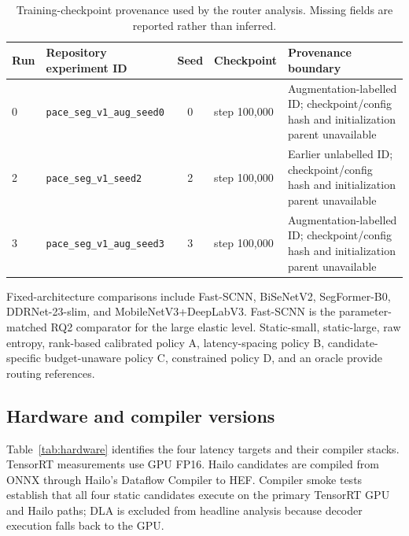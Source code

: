 \documentclass[a4paper,review,12pt]{elsarticle}
\begin{document}
\begin{table}[t]
\centering
\caption{Training-checkpoint provenance used by the router analysis. Missing fields are reported rather than inferred.}
\label{tab:provenance}
\small
\begin{tabularx}{\textwidth}{@{}lXclX@{}}
\toprule
Run & Repository experiment ID & Seed & Checkpoint & Provenance boundary \\
\midrule
0 & \texttt{pace\_seg\_v1\_aug\_seed0} & 0 & step 100,000 & Augmentation-labelled ID; checkpoint/config hash and initialization parent unavailable \\
2 & \texttt{pace\_seg\_v1\_seed2} & 2 & step 100,000 & Earlier unlabelled ID; checkpoint/config hash and initialization parent unavailable \\
3 & \texttt{pace\_seg\_v1\_aug\_seed3} & 3 & step 100,000 & Augmentation-labelled ID; checkpoint/config hash and initialization parent unavailable \\
\bottomrule
\end{tabularx}
\end{table}

Fixed-architecture comparisons include Fast-SCNN, BiSeNetV2, SegFormer-B0, DDRNet-23-slim, and MobileNetV3+DeepLabV3. Fast-SCNN is the parameter-matched RQ2 comparator for the large elastic level. Static-small, static-large, raw entropy, rank-based calibrated policy A, latency-spacing policy B, candidate-specific budget-unaware policy C, constrained policy D, and an oracle provide routing references.

\subsection{Hardware and compiler versions}

Table~\ref{tab:hardware} identifies the four latency targets and their compiler stacks. TensorRT measurements use GPU FP16. Hailo candidates are compiled from ONNX through Hailo's Dataflow Compiler to HEF. Compiler smoke tests establish that all four static candidates execute on the primary TensorRT GPU and Hailo paths; DLA is excluded from headline analysis because decoder execution falls back to the GPU.
\end{document}
